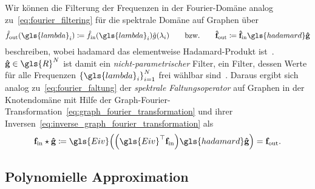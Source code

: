 Wir können die Filterung der Frequenzen in der Fourier-Domäne analog zu~\eqref{eq:fourier_filtering} für die spektrale Domäne auf Graphen über
\begin{equation*}
  \hat f_{\mathrm{out}}\left(\gls{lambda}_i\right) \coloneqq \hat f_{\mathrm{in}}\left(\gls{lambda}_i\right)\hat g\left(\lambda_i\right)
  \qquad
  \text{\bzw{}}
  \qquad
  \ve{\hat f}_{\mathrm{out}} \coloneqq \ve{\hat f}_{\mathrm{in}} \gls{hadamard} \ve{\hat g}
\end{equation*}
beschreiben, wobei \gls{hadamard} das elementweise Hadamard-Produkt ist~\cite{Shuman}.
$\ve{\hat g} \in \gls{R}^N$ ist damit ein \emph{nicht-parametrischer} Filter, \dhe{} ein Filter, dessen Werte für alle Frequenzen ${\left\{\gls{lambda}_i\right\}}_{i=1}^N$ frei wählbar sind~\cite{Defferrard}.
Daraus ergibt sich analog zu~\eqref{eq:fourier_faltung} der \emph{spektrale Faltungsoperator} auf Graphen in der Knotendomäne mit Hilfe der Graph-Fourier-Transformation~\eqref{eq:graph_fourier_transformation} und ihrer Inversen~\eqref{eq:inverse_graph_fourier_transformation} als~\cite{Shuman, Defferrard}
\begin{equation}
  \ve{f}_{\mathrm{in}} \star \ve{\hat g} \coloneqq \gls{Eiv}\left(\left(\gls{Eiv}^{\top}\ve{f}_{\mathrm{in}}\right) \gls{hadamard} \ve{\hat g}\right) = \ve{f}_{\mathrm{out}}.
  \label{eq:spektraler_faltungsoperator}
\end{equation}

\subsection{Polynomielle Approximation}
\label{polynomielle_approximation}

